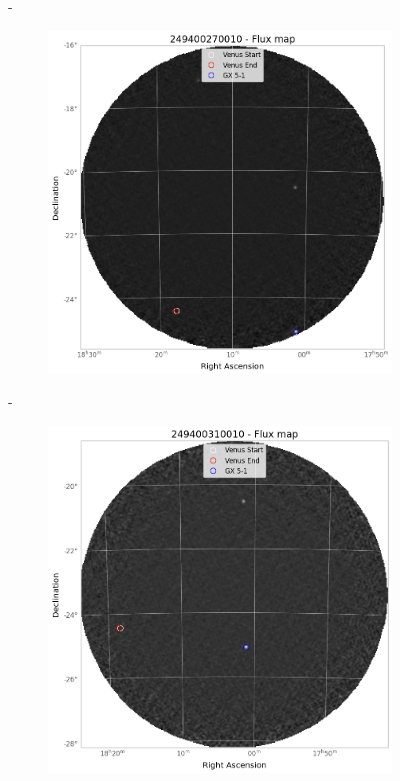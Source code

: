 \begin{figure}[H]
\begin{subfigure}{.3\textwidth}
        \end{subfigure}
        \hspace{1em}-
        \begin{subfigure}{.3\textwidth}
            \centering
            \includegraphics[width=\textwidth]{report/Figures/methods/2204/27_map.png}
        \end{subfigure}
        \hspace{1em}-
        \begin{subfigure}{.3\textwidth}
            \centering
            \includegraphics[width=\textwidth]{report/Figures/methods/2204/31_map.png}

\end{subfigure}
\end{figure}
